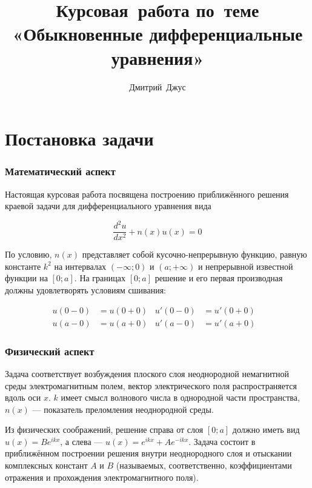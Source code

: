 \documentclass{article}
\numberwithin{equation}{section}
\begin{document}
\author{Дмитрий Джус}
\title{Курсовая работа по теме\\ «Обыкновенные дифференциальные уравнения»}
\maketitle
\thispagestyle{empty}

\clearpage
\tableofcontents

\clearpage
\part{Постановка задачи}

\section{Математический аспект}

Настоящая курсовая работа посвящена построению приближённого решения
краевой задачи для дифференциального уравнения вида

\begin{equation}\label{deq}
  \frac{d^2 u}{dx^2} + n(x) u(x) = 0
\end{equation}

По условию, $n(x)$ представляет собой кусочно-непрерывную функцию,
равную константе $k^2$ на интервалах $(-\infty; 0)$ и $(a; +\infty)$ и
непрерывной известной функции на $[0; a]$. На границах $[0; a]$
решение и его первая производная должны удовлетворять условиям
сшивания:

\begin{subequations}\label{conds}
  \begin{align}
    u(0-0)& = u(0+0)&
    u'(0-0)& = u'(0+0)&\label{conds-left} \\
    u(a-0)& = u(a+0)&
    u'(a-0)& = u'(a+0)&\label{conds-right}
  \end{align}
\end{subequations}

\section{Физический аспект}

Задача соответствует возбуждения плоского слоя неоднородной
немагнитной среды электромагнитным полем, вектор электрического поля
распространяется вдоль оси $x$. $k$ имеет смысл волнового числа в
однородной части пространства, $n(x)$ — показатель преломления
неоднородной среды.

Из физических соображений, решение справа от слоя $[0; a]$ должно
иметь вид $u(x) = Be^{ikx}$, а слева — $u(x) = e^{ikx} +
Ae^{-ikx}$. Задача состоит в приближённом построении решения внутри
неоднородного слоя и отыскании комплексных констант $A$ и $B$
(называемых, соответственно, коэффициентами отражения и прохождения
электромагнитного поля).
\end{document}
